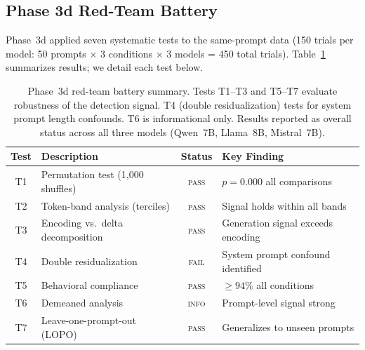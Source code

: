 \subsection{Phase 3d Red-Team Battery}
\label{sec:redteam_battery}

Phase~3d applied seven systematic tests to the same-prompt data (150 trials per model: 50 prompts $\times$ 3 conditions $\times$ 3 models = 450 total trials).
Table~\ref{tab:redteam_summary} summarizes results; we detail each test below.

\begin{table}[t]
  \centering
  \caption{Phase~3d red-team battery summary.
  Tests T1--T3 and T5--T7 evaluate robustness of the detection signal.
  T4 (double residualization) tests for system prompt length confounds.
  T6 is informational only.
  Results reported as overall status across all three models (Qwen~7B, Llama~8B, Mistral~7B).}
  \label{tab:redteam_summary}
  \begin{tabular}{@{}clcl@{}}
    \toprule
    Test & Description & Status & Key Finding \\
    \midrule
    T1 & Permutation test (1{,}000 shuffles) & \textsc{pass} & $p = 0.000$ all comparisons \\
    T2 & Token-band analysis (terciles) & \textsc{pass} & Signal holds within all bands \\
    T3 & Encoding vs.\ delta decomposition & \textsc{pass} & Generation signal exceeds encoding \\
    T4 & Double residualization & \textsc{fail} & System prompt confound identified \\
    T5 & Behavioral compliance & \textsc{pass} & $\geq 94\%$ all conditions \\
    T6 & Demeaned analysis & \textsc{info} & Prompt-level signal strong \\
    T7 & Leave-one-prompt-out (LOPO) & \textsc{pass} & Generalizes to unseen prompts \\
    \bottomrule
  \end{tabular}
\end{table}

